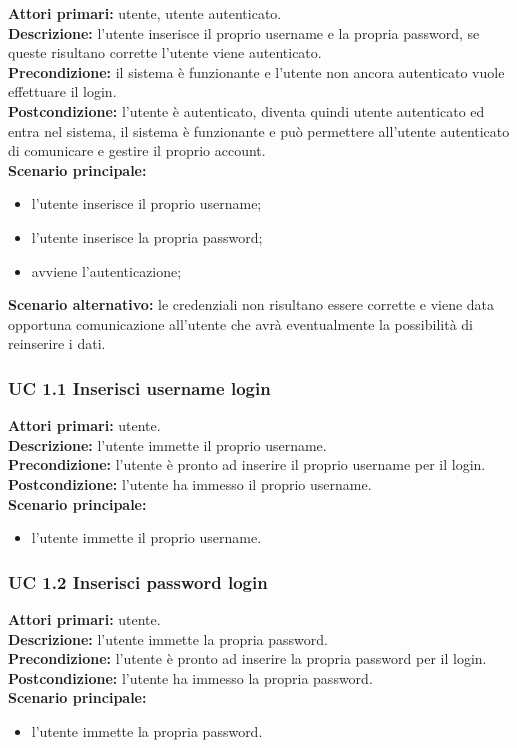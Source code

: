 \noindent
\textbf{Attori primari:} utente, utente autenticato.\\
\textbf{Descrizione:} l'utente inserisce il proprio username e la propria password, se queste risultano corrette l'utente viene autenticato.\\
\textbf{Precondizione:} il sistema è funzionante e l'utente non ancora autenticato vuole effettuare il login.\\
\textbf{Postcondizione:} l'utente è autenticato, diventa quindi utente autenticato ed entra nel sistema, il sistema è funzionante e può permettere all'utente autenticato di comunicare e gestire il proprio account.\\
\textbf{Scenario principale:}
\begin{itemize}
\item l'utente inserisce il proprio username;
\item l'utente inserisce la propria password;
\item avviene l'autenticazione;
\end{itemize}					
\textbf{Scenario alternativo:} le credenziali non risultano essere corrette e viene data opportuna comunicazione all'utente che avrà eventualmente la possibilità di reinserire i dati.\\

\subsubsection{UC 1.1 Inserisci username login}
\noindent
\textbf{Attori primari:} utente.\\
\textbf{Descrizione:} l'utente immette il proprio username.\\
\textbf{Precondizione:} l'utente è pronto ad inserire il proprio username per il login.\\
\textbf{Postcondizione:} l'utente ha immesso il proprio username.\\
\textbf{Scenario principale:}
\begin{itemize}
\item l'utente immette il proprio username.
\end{itemize}

\subsubsection{UC 1.2 Inserisci password login}
\noindent
\textbf{Attori primari:} utente.\\
\textbf{Descrizione:} l'utente immette la propria password.\\
\textbf{Precondizione:} l'utente è pronto ad inserire la propria password per il login.\\
\textbf{Postcondizione:} l'utente ha immesso la propria password.\\
\textbf{Scenario principale:}
\begin{itemize}
\item l'utente immette la propria password.
\end{itemize}

